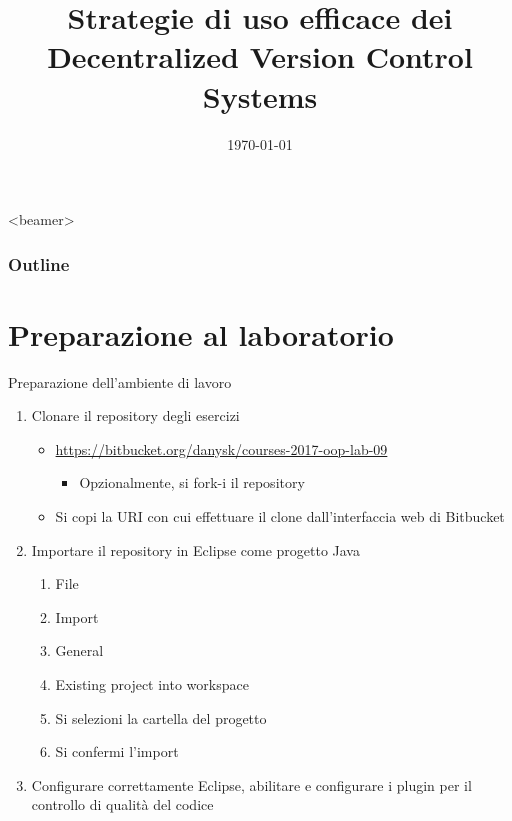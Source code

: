 \documentclass[presentation]{beamer}
\title[{\lab} -- DVCS Workflow]{Strategie di uso efficace dei \\ Decentralized Version Control Systems}
\date[\today]{\today}
\begin{document}
\frame[label=coverpage]{\titlepage}

\begin{frame}<beamer>
 	\frametitle{Outline}
 	\tableofcontents[]
\end{frame}

\section{Preparazione al laboratorio}

\begin{frame}{Preparazione dell'ambiente di lavoro}
	\begin{enumerate}
		\item Clonare il repository degli esercizi
		\begin{itemize}
			\item \url{https://bitbucket.org/danysk/courses-2017-oop-lab-09}
			\begin{itemize}
				\item Opzionalmente, si fork-i il repository
			\end{itemize}
			\item Si copi la URI con cui effettuare il clone dall'interfaccia web di Bitbucket
		\end{itemize}
		\item Importare il repository in Eclipse come progetto Java
		\begin{enumerate}
			\item File
			\item Import
			\item General
			\item Existing project into workspace
			\item Si selezioni la cartella del progetto
			\item Si confermi l'import
		\end{enumerate}
		\item Configurare correttamente Eclipse, abilitare e configurare i plugin per il controllo di qualità del codice
	\end{enumerate}
\end{frame}
\end{document}
